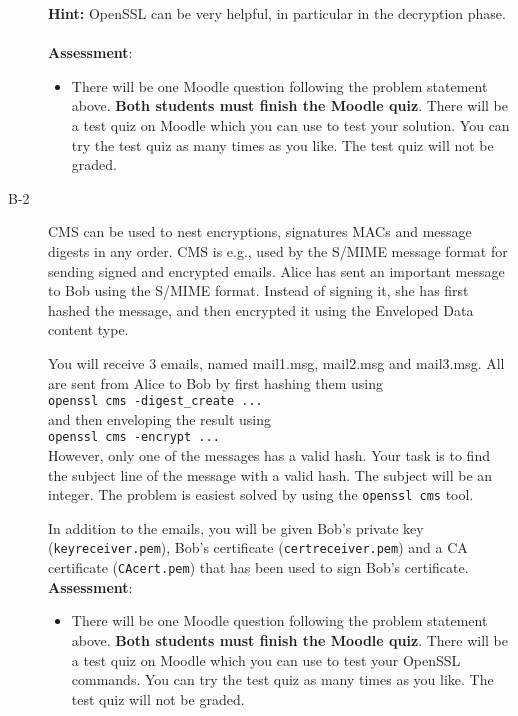 \documentclass{article}
\begin{document}
\begin{description}
{			\textbf{Hint:} OpenSSL can be very helpful, in particular in the decryption phase.\\\\
			
			\textbf{Assessment}:
			\begin{itemize}
				\item There will be one Moodle question following the problem statement above. \textbf{Both students must finish the Moodle quiz}.
				There will be a test quiz on Moodle which you can use to test your solution. You can try the test quiz as many times as you like. The test quiz will not be graded.
			\end{itemize}
		}
		
		\item[B-2]{CMS can be used to nest encryptions, signatures MACs and message digests in any order. CMS is e.g., used by the S/MIME message format for sending signed and encrypted emails. Alice has sent an important message to Bob using the S/MIME format. Instead of signing it, she has first hashed the message, and then encrypted it using the Enveloped Data content type.
			
			You will receive 3 emails, named mail1.msg, mail2.msg and mail3.msg. All are sent from Alice to Bob by first hashing them using \\ \texttt{openssl cms -digest\_create ...}\\ and then enveloping the result using \\\texttt{openssl cms -encrypt ...}\\However, only one of the messages has a valid hash. Your task is to find the subject line of the message with a valid hash. The subject will be an integer. The problem is easiest solved by using the \texttt{openssl cms} tool.
			
			In addition to the emails, you will be given Bob's private key (\texttt{keyreceiver.pem}), Bob's certificate (\texttt{certreceiver.pem}) and a CA certificate (\texttt{CAcert.pem}) that has been used to sign Bob's certificate.\\
			\textbf{Assessment}:
			\begin{itemize}
				\item There will be one Moodle question following the problem statement above. \textbf{Both students must finish the Moodle quiz}.
				There will be a test quiz on Moodle which you can use to test your OpenSSL commands. You can try the test quiz as many times as you like. The test quiz will not be graded.
			\end{itemize}}
			

\end{description}
\end{document}
